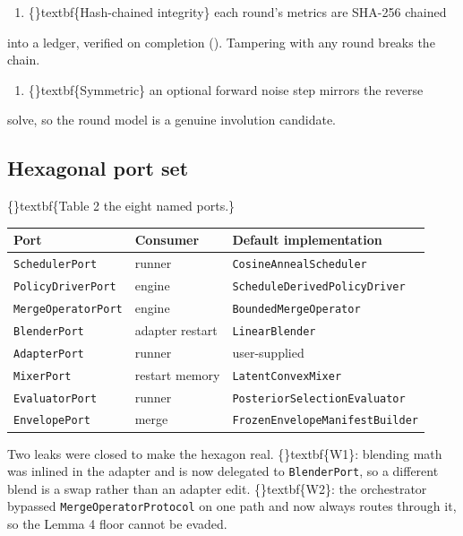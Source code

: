 \documentclass{article}
\begin{document}
\begin{enumerate}
\item \{\}textbf\{Hash-chained integrity\}  each round's metrics are SHA-256 chained
\end{enumerate}
into a ledger, verified on completion (). Tampering with any round breaks the chain.

\begin{enumerate}
\item \{\}textbf\{Symmetric\}  an optional forward noise step mirrors the reverse
\end{enumerate}
solve, so the round model is a genuine involution candidate.

\subsection{Hexagonal port set}
\{\}textbf\{Table 2  the eight named ports.\}

\begin{table}[ht]
\centering
\small
\begin{tabular}{lll}
\hline
\textbf{Port} & \textbf{Consumer} & \textbf{Default implementation} \\
\hline
\texttt{SchedulerPort} & runner & \texttt{CosineAnnealScheduler} \\
\texttt{PolicyDriverPort} & engine & \texttt{ScheduleDerivedPolicyDriver} \\
\texttt{MergeOperatorPort} & engine & \texttt{BoundedMergeOperator} \\
\texttt{BlenderPort} & adapter restart & \texttt{LinearBlender} \\
\texttt{AdapterPort} & runner & user-supplied \\
\texttt{MixerPort} & restart memory & \texttt{LatentConvexMixer} \\
\texttt{EvaluatorPort} & runner & \texttt{PosteriorSelectionEvaluator} \\
\texttt{EnvelopePort} & merge & \texttt{FrozenEnvelopeManifestBuilder} \\
\hline
\end{tabular}
\end{table}

Two leaks were closed to make the hexagon real. \{\}textbf\{W1\}: blending math was inlined in the adapter and is now delegated to \texttt{BlenderPort}, so a different blend is a swap rather than an adapter edit. \{\}textbf\{W2\}: the orchestrator bypassed \texttt{MergeOperatorProtocol} on one path and now always routes through it, so the Lemma 4 floor cannot be evaded.
\end{document}
